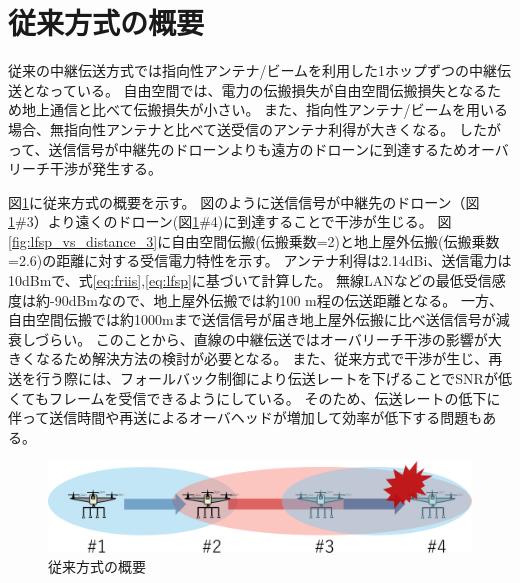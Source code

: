 \documentclass[a4paper,10.5pt]{ltjsarticle}
\begin{document}
\clearpage
\section{従来方式の概要}
従来の中継伝送方式では指向性アンテナ/ビームを利用した1ホップずつの中継伝送となっている。
自由空間では、電力の伝搬損失が自由空間伝搬損失となるため地上通信と比べて伝搬損失が小さい。
また、指向性アンテナ/ビームを用いる場合、無指向性アンテナと比べて送受信のアンテナ利得が大きくなる。
したがって、送信信号が中継先のドローンよりも遠方のドローンに到達するためオーバリーチ干渉が発生する。

図\ref{fig:conventional_topology}に従来方式の概要を示す。
図のように送信信号が中継先のドローン（図\ref{fig:conventional_topology}\#3）より遠くのドローン(図\ref{fig:conventional_topology}\#4)に到達することで干渉が生じる。
図\ref{fig:lfsp_vs_distance_3}に自由空間伝搬(伝搬乗数=2)と地上屋外伝搬(伝搬乗数=2.6)の距離に対する受信電力特性を示す。
アンテナ利得は2.14dBi、送信電力は10dBmで、式\ref{eq:friis},\ref{eq:lfsp}に基づいて計算した。
無線LANなどの最低受信感度は約-90dBmなので、地上屋外伝搬では約100 m程の伝送距離となる。
一方、自由空間伝搬では約1000mまで送信信号が届き地上屋外伝搬に比べ送信信号が減衰しづらい。
このことから、直線の中継伝送ではオーバリーチ干渉の影響が大きくなるため解決方法の検討が必要となる。
また、従来方式で干渉が生じ、再送を行う際には、フォールバック制御により伝送レートを下げることでSNRが低くてもフレームを受信できるようにしている。
そのため、伝送レートの低下に伴って送信時間や再送によるオーバヘッドが増加して効率が低下する問題もある。



\begin{figure}[H]
  \centering
  \includegraphics[width=\linewidth]{cenventional_topology.pdf} %
  \caption{従来方式の概要}
  \label{fig:conventional_topology} %
\end{figure}
\end{document}
